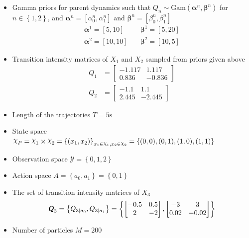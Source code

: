 \begin{itemize}
	\item Gamma priors for parent dynamics such that $ Q_{n} \sim \mathrm{Gam}(\symbf{\alpha}^n, \symbf{\beta}^n)$ for $n \in \left\lbrace 1,2\right\rbrace $, and $ \symbf{\alpha}^n = [\alpha^n_0, \alpha^n_1] $ and $ \symbf{\beta}^n = [\beta^n_0, \beta^n_1] $
	\begin{align}
	\symbf{\alpha}^1 = [5,10] &\quad \symbf{\beta}^1 = [5,20] \\
	\symbf{\alpha}^2 = [10,10] &\quad \symbf{\beta}^2 = [10,5]
	\label{eq:gamma_params}
	\end{align}
	\item Transition intensity matrices of $ X_1 $ and $ X_2 $ sampled from priors given above
	\begin{align}
	Q_1 &= 
	\begin{bmatrix}
	-1.117 & 1.117 \\
	0.836 &  -0.836
	\end{bmatrix} \\
	Q_2 &= 
	\begin{bmatrix}
	-1.1 & 1.1 \\
	2.445 &  -2.445
	\end{bmatrix}
	\end{align}
	\item Length of the trajectories $ T = 5\text{s} $
	\item State space $ \rchi_{P} = \rchi_1 \times \rchi_2 = \left\lbrace (x_1, x_2)\right\rbrace_{x_1\in \rchi_1, x_2\in \rchi_2} = \left\lbrace (0, 0), (0, 1), (1, 0),(1, 1)\right\rbrace $
	\item Observation space $ \mathcal{Y} = \left\lbrace 0, 1, 2 \right\rbrace $
	\item Action space $ \textit{A} = \left\lbrace a_{0}, a_{1} \right\rbrace = \left\lbrace 0, 1\right\rbrace $
	\item The set of transition intensity matrices of $ X_3 $
	\begin{align}
	\textbf{\textit{Q}}_3 = \left\lbrace Q_{3\mid a_{0}}, Q_{3\mid a_{1}} \right\rbrace = \left\lbrace 
	\begin{bmatrix}
	-0.5 & 0.5 \\
	2 &  -2
	\end{bmatrix}, 
	\begin{bmatrix}
	-3 & 3 \\
	0.02 &  -0.02
	\end{bmatrix} 
	\right\rbrace 
	\end{align}
	\item Number of particles $ M = 200 $

\end{itemize}
